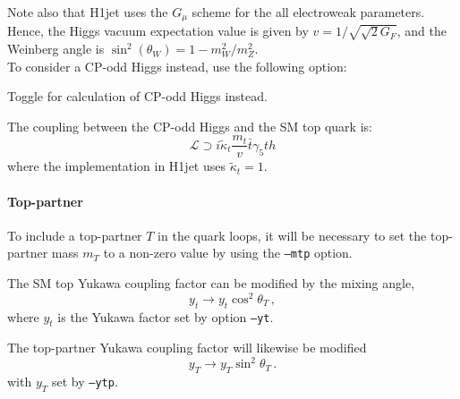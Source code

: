 \documentclass[12pt,a4wide]{article}
\begin{document}
Note also that H1jet uses the $G_{\mu}$ scheme for the all electroweak parameters. Hence, the Higgs vacuum expectation value is given by $v = 1 / \sqrt{\sqrt{2} G_F}$, and the Weinberg angle is $\sin^2\left ( \theta_W \right ) = 1 - m_W^2 / m_Z^2$. \\ 

To consider a CP-odd Higgs instead, use the following option: 
\begin{description}[labelindent=\parindent, labelwidth =\widthof{\bfseries9999999999999999999999}, leftmargin = !] 
	\item[\texttt{--cpodd}] Toggle for calculation of CP-odd Higgs instead. 
\end{description}
The coupling between the CP-odd Higgs and the SM top quark is: 
\begin{equation}
   \mathcal{L} \supset i \tilde{\kappa}_t \frac{m_t}{v} \bar{t} \gamma_5 t h
\end{equation}
where the implementation in H1jet uses $\tilde{\kappa}_t = 1$. 

\paragraph{Top-partner} 
To include a top-partner $T$ in the quark loops, it will be necessary to set the top-partner mass $m_T$ to a non-zero value by using the \texttt{--mtp} option. 

The SM top Yukawa coupling factor can be modified by the mixing angle, 
\begin{equation}
   y_t \rightarrow y_t \cos^2\theta_T \,, 
\end{equation} 
where $y_t$ is the Yukawa factor set by option \texttt{--yt}. 

The top-partner Yukawa coupling factor will likewise be modified 
\begin{equation}
   y_T \rightarrow y_T \sin^2\theta_T \,. 
\end{equation} 
with $y_T$ set by \texttt{--ytp}. 
\end{document}
